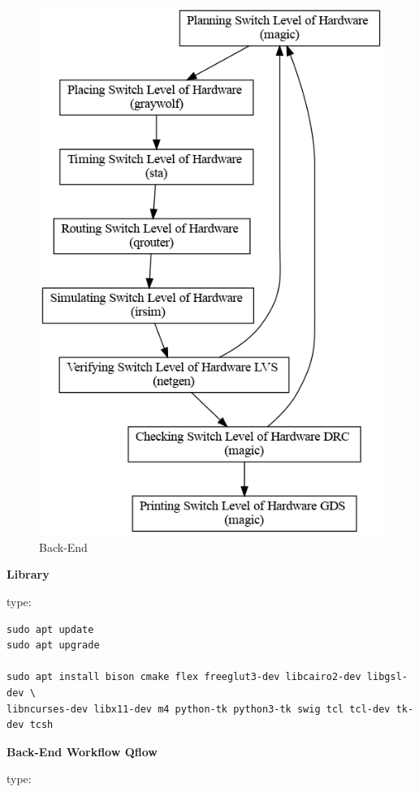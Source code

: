 \documentclass[
]{article}
\begin{document}
\begin{figure}
\centering
\includegraphics{../doc/back-end.png}
\caption{Back-End}
\end{figure}

\textbf{Library}

type:

\begin{verbatim}
sudo apt update
sudo apt upgrade

sudo apt install bison cmake flex freeglut3-dev libcairo2-dev libgsl-dev \
libncurses-dev libx11-dev m4 python-tk python3-tk swig tcl tcl-dev tk-dev tcsh
\end{verbatim}

\textbf{Back-End Workflow Qflow}

type:
\end{document}
